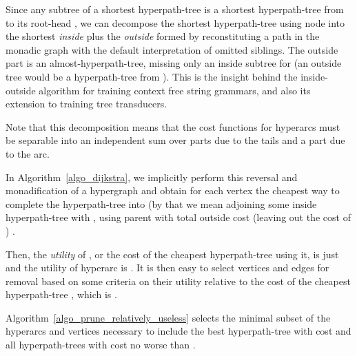 \documentclass[english]{article}
\newcommand\algname[1]{\textbf{#1}}
\newcommand\algref[1]{Algorithm~\ref{#1}}
\begin{document}
  Since any subtree of a shortest hyperpath-tree  is a
  shortest hyperpath-tree from  to its root-head , we can
  decompose the shortest hyperpath-tree using node  into the shortest
  \emph{inside}  plus the \emph{outside}  formed by
  reconstituting a path in the monadic graph with the default interpretation of
  omitted siblings.  The outside part is an almost-hyperpath-tree, missing only
  an inside subtree for  (an outside tree would be a hyperpath-tree
  from ).  This is the insight behind the
  inside-outside algorithm\cite{InsideOutside} for training context free string
  grammars, and also its extension to training tree transducers\cite{TTT}.

  Note that this decomposition means that the cost functions for hyperarcs must
  be separable into an independent sum over parts due to the tails and a part
  due to the arc.

  In \algref{algo_dijkstra}, we implicitly perform this reversal and
  monadification of a hypergraph and obtain for each vertex  the cheapest way
  to complete the hyperpath-tree  into  (by
  that we mean adjoining some inside hyperpath-tree  with , using
  parent  with total outside cost (leaving out the cost of ) .

  Then, the \emph{utility} of , or the cost of the
  cheapest hyperpath-tree using it, is just  and the utility of hyperarc  is .  It is then easy to select
  vertices and edges for removal based on some criteria on their utility
  relative to the cost of the cheapest hyperpath-tree , which is
  .

  \algref{algo_prune_relatively_useless} selects the minimal
  subset of the hyperarcs and vertices necessary to include the best
  hyperpath-tree  with cost  and all hyperpath-trees
  with cost no worse than .

\newcommand\holdout[3]{{\algname{COSTEXCEPT_{#1}({#2},{#3})}}}
\end{document}
